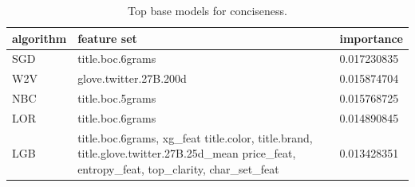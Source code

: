\documentclass[sigconf]{acmart}
\begin{document}
\begin{table}[t]
\small
\centering
\caption{Top base models for conciseness.}
\label{tbl:base_conciseness}
\begin{tabular}{l p{3.5cm} l}
\hline
\textbf{algorithm} & \textbf{feature set} & \textbf{importance} \\ \hline

SGD & title.boc.6grams &	0.017230835 \\
W2V & glove.twitter.27B.200d & 0.015874704 \\
NBC & title.boc.5grams &	0.015768725 \\
LOR & title.boc.6grams & 0.014890845 \\
LGB & title.boc.6grams, xg\_feat title.color, title.brand, title.glove.twitter.27B.25d\_mean price\_feat, entropy\_feat, top\_clarity, char\_set\_feat & 0.013428351 \\

\hline
\end{tabular}
\end{table}
\end{document}
